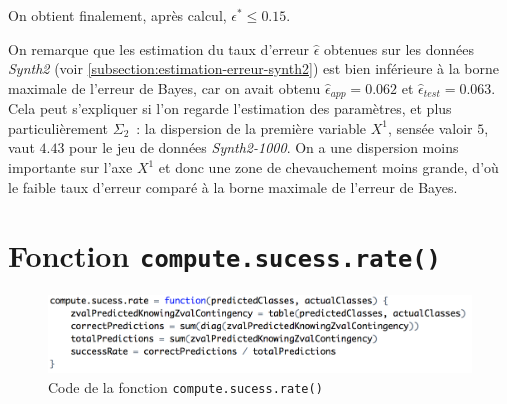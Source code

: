 \documentclass[a4paper,10pt]{report}
\begin{document}
On obtient finalement, après calcul, $\epsilon^* \leq 0.15$.

On remarque que les estimation du taux d'erreur $ \hat{\epsilon}$ obtenues sur les données \textit{Synth2} (voir \autoref{subsection:estimation-erreur-synth2}) est bien inférieure à la borne maximale de l'erreur de Bayes, car on avait obtenu $\hat{\epsilon}_{app} = 0.062$ et $\hat{\epsilon}_{test} = 0.063$.\\
Cela peut s'expliquer si l'on regarde l'estimation des paramètres, et plus particulièrement $\Sigma_{2}$~: la dispersion de la première variable $X^1$, sensée valoir $5$, vaut $4.43$ pour le jeu de données \textit{Synth2-1000}. On a une dispersion moins importante sur l'axe $X^1$ et donc une zone de chevauchement moins grande, d'où le faible taux d'erreur comparé à la borne maximale de l'erreur de Bayes.


























\appendix









\chapter{Fonction \texttt{compute.sucess.rate()}}
\label{annexe:compute.sucess.rate}
\begin{figure}[H]
	\centering
	\captionsetup{justification=centering, margin=4cm}
	\includegraphics[width=.9\linewidth]{img/annexe-1-compute-sucess-rate}
	\caption{\small Code de la fonction \texttt{compute.sucess.rate()}}	
	\label{fig:annexe-1-compute-sucess-rate}%
\end{figure}
\end{document}
